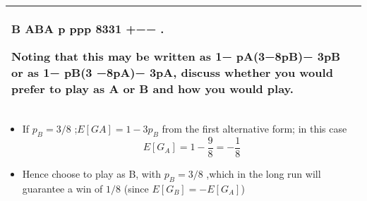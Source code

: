\documentclass[a4paper,12pt]{article}
\begin{document}
\begin{enumerate}[(a)]
\begin{table}[ht!]
\begin{tabular}{|p{15cm}|}
   B ABA p ppp 8331 +−− . 
 
 Noting that this may be written as 1− pA(3−8pB)− 3pB or as 1− pB(3 −8pA)− 3pA, discuss whether you would prefer to play as A or B and how you would play. \\ \hline
   \end{tabular}
 \end{table}
\begin{itemize}
\item If $p_B = 3/8$ ;$E[GA] = 1 - 3p_B$ from the first alternative form; in this case \[E[G_A] =
1 - \frac{9}{8}  = - \frac{1}{8}\]
\item Hence choose to play as B, with $p_B = 3/8$ ,which in the long run will guarantee a win of $1/8$
(since $E[G_B] = -E[G_A]$)
\end{itemize}
\end{enumerate}
\end{document}

